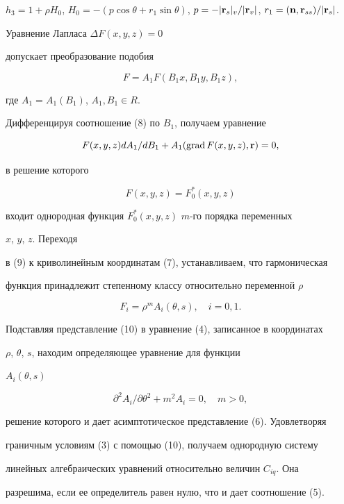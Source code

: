 \begin{pf}
$h_3=1+\rho H_0$, $H_0=-(p\cos\theta+r_1\sin\theta)$, $p=-|\bold 


r_s|_v/|\bold r_v|$, $r_1=(\bold n,\bold r_{s s})/|\bold r_s|$. 


 


Уравнение Лапласа $\Delta F(x,y,z)=0$ 


допускает преобразование подобия 


\begin{equation} 


F=A_1F(B_1x,B_1y,B_1z), 


\end{equation} 


где $A_1=A_1(B_1)$, $A_1,B_1\in R$. 


Дифференцируя соотношение (8) по $B_1$, получаем уравнение 


$$ 


F(x,y,z)d A_1/d B_1+A_1(\Grad F(x,y,z),\bold r)=0, 


$$ 


в решение которого 


\begin{equation} 


F(x,y,z)=F^*_0(x,y,z) 


\end{equation} 


входит однородная функция $F^*_0(x,y,z)$\; $m$-го порядка переменных 


$x$, $y$, $z$. Переходя 


в (9) к криволинейным координатам (7), устанавливаем, что гармоническая  


функция принадлежит степенному классу относительно переменной $\rho$ 


\begin{equation} 


F_i=\rho^m A_i(\theta,s),\quad i=0,1. 


\end{equation} 


Подставляя представление (10) в уравнение (4), записанное в координатах  


$\rho$, $\theta$, $s$, находим определяющее уравнение для функции 


$A_i(\theta,s)$ 


$$ 


\partial^2A_i/\partial\theta^2+m^2A_i=0,\quad m>0, 


$$ 


решение которого и дает асимптотическое представление (6). Удовлетворяя  


граничным условиям (3) с помощью (10), получаем однородную систему  


линейных алгебраических уравнений относительно величин $C_{i q}$. Она 


разрешима, если ее определитель равен нулю, что и дает соотношение (5). 


\end{pf} 


